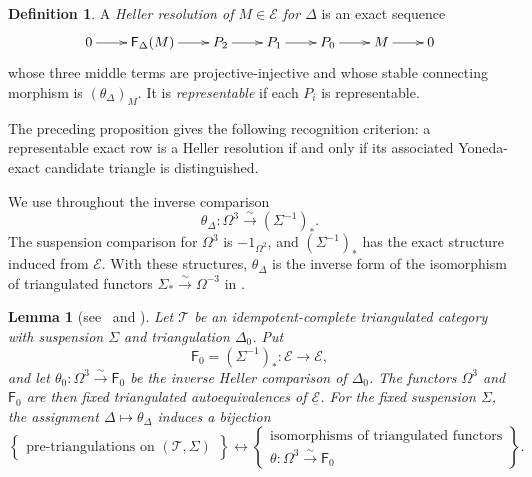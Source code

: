 \documentclass[a4paper,11pt,reqno]{amsart}
\newtheorem{lemma}[lemma]{Lemma}
\theoremstyle{definition}
\newtheorem{definition}[definition]{Definition}
\theoremstyle{plain}
\numberwithin{equation}{section}
\newcommand{\T}{\mathcal T}
\begin{document}
\begin{definition}
\label{def:heller-resolution}
A \emph{Heller resolution of $M\in\mathcal E$ for $\Delta$} is an exact
sequence
\begin{equation*}
\xymatrix@C=1.8pc{
0\ar[r]&\mathsf F_\Delta(M)\ar[r]&P_2\ar[r]&P_1\ar[r]&P_0\ar[r]&M\ar[r]&0
}
\end{equation*}
whose three middle terms are projective-injective and whose stable
connecting morphism is $(\theta_\Delta)_M$.  It is
\emph{representable} if each $P_i$ is representable.
\end{definition}

The preceding proposition gives the following recognition criterion: a
representable exact row is a Heller resolution if and only if its associated
Yoneda-exact candidate triangle is distinguished.

We use throughout the inverse comparison
\[
 \theta_\Delta:\Omega^3\xrightarrow{\sim}(\Sigma^{-1})_*.
\]
The suspension comparison for $\Omega^3$ is $-1_{\Omega^2}$, and
$(\Sigma^{-1})_*$ has the exact structure induced from $\mathcal E$.
With these structures, $\theta_\Delta$ is the inverse form of the
isomorphism of triangulated functors $\Sigma_*\xrightarrow{\sim}\Omega^{-3}$ in
\cite[Lemma~3.2 and Proposition~3.4]{GKO2013}.

\begin{lemma}[{\normalfont see~\cite[Theorem~16.4]{Heller1968} and
\cite[Lemma~3.3 and Proposition~3.4]{GKO2013}}]
\label{lem:heller-parameters}
Let \(\T\) be an idempotent-complete triangulated category with suspension
\(\Sigma\) and triangulation \(\Delta_0\).
Put
\[
 \mathsf F_0=(\Sigma^{-1})_*:\mathcal E\longrightarrow\mathcal E,
\]
and let $\theta_0:\Omega^3\xrightarrow{\sim}\mathsf F_0$ be the inverse
Heller comparison of $\Delta_0$.  The functors $\Omega^3$ and $\mathsf F_0$
are then fixed triangulated autoequivalences of $\underline{\mathcal E}$.
For the fixed suspension $\Sigma$, the assignment
$\Delta\mapsto\theta_\Delta$ induces a bijection
\[
\left\{
 \begin{array}{c}
 \text{pre-triangulations on $(\T,\Sigma)$}
 \end{array}
\right\}
\longleftrightarrow
\left\{
 \begin{array}{c}
 \text{isomorphisms of triangulated functors}\\[-2pt]
 \theta:\Omega^3\xrightarrow{\sim}\mathsf F_0
 \end{array}
\right\}.
\]
\end{lemma}
\end{document}
